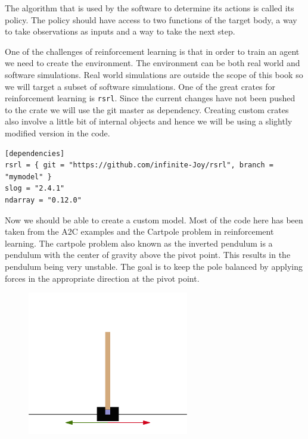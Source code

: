 \documentclass{book}
\begin{document}
The algorithm that is used by the software to determine its actions is called its policy. The policy should have access to two functions of the target body, a way to take observations as inputs and a way to take the next step.

One of the challenges of reinforcement learning is that in order to train an agent we need to create the environment. The environment can be both real world and software simulations. Real world simulations are outside the scope of this book so we will target a subset of software simulations. One of the great crates for reinforcement learning is \lstinline{rsrl}. Since the current changes have not been pushed to the crate we will use the git master as dependency. Creating custom crates also involve a little bit of internal objects and hence we will be using a slightly modified version in the code.


\begin{lstlisting}[caption={chapter3\\/rsrl\_custom\\/Cargo\\.toml},basicstyle=\small]
[dependencies]
rsrl = { git = "https://github.com/infinite-Joy/rsrl", branch = "mymodel" }
slog = "2.4.1"
ndarray = "0.12.0"
\end{lstlisting}

Now we should be able to create a custom model. Most of the code here has been taken from the A2C examples and the Cartpole problem in reinforcement learning. The cartpole problem also known as the inverted pendulum is a pendulum with the center of gravity above the pivot point. This results in the pendulum being very unstable. The goal is to keep the pole balanced by applying forces in the appropriate direction at the pivot point.

\begin{figure}
\begin{center}
	\includegraphics[scale=0.6]{Figures/cartpole.png}
\end{center}
\caption{}
\label{fig:cartpole}
\end{figure}
\end{document}
